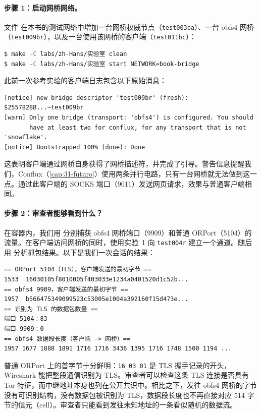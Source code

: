 \paragraph{步骤 1：启动网桥网络。}文件  在本书的测试网络中增加一台网桥权威节点（\texttt{test003ba}）、一台 obfs4 网桥（\texttt{test009br}），以及一台使用该网桥的客户端（\texttt{test011bc}）：
\begin{lstlisting}[language=bash,numbers=none]
$ make -C labs/zh-Hans/实验室 clean
$ make -C labs/zh-Hans/实验室 start NETWORK=book-bridge
\end{lstlisting}
此前一次参考实验的客户端日志包含以下原始消息：
\begin{lstlisting}[numbers=none]
[notice] new bridge descriptor 'test009br' (fresh): $2557828B...~test009br
[warn] Only one bridge (transport: 'obfs4') is configured. You should
       have at least two for conflux, for any transport that is not 'snowflake'.
[notice] Bootstrapped 100% (done): Done
\end{lstlisting}
这表明客户端通过网桥自身获得了网桥描述符，并完成了引导。警告信息提醒我们，Conflux（\cref{cap:31-futuro}）使用两条并行电路，只有一台网桥就无法做到这一点。通过此客户端的 SOCKS 端口（9011）发送网页请求，效果与普通客户端相同。

\paragraph{步骤 2：审查者能够看到什么？}在容器内，我们用  分别捕获 obfs4 网桥端口（9909）和普通 ORPort（5104）的流量。在客户端访问网桥的同时，使用实验~1 向 \texttt{test004r} 建立一个通道。随后用  分析抓包结果。以下是我们一次会话的结果：
\begin{lstlisting}[numbers=none]
== ORPort 5104（TLS），客户端发送的最初字节 ==
1533  16030105f8010005f403033e1234a0401520d1c52b...
== obfs4 9909，客户端发送的最初字节 ==
1957  b566475349099523c53005e1004a392160f15d473e...
== 识别为 TLS 的数据包数量 ==
端口 5104：83
端口 9909：0
== obfs4 数据段长度（客户端 -> 网桥）==
1957 1677 1888 1891 1716 1716 3436 1395 1716 1748 1500 1194 ...
\end{lstlisting}
普通 ORPort 上的首字节十分鲜明：\texttt{16 03 01} 是 TLS 握手记录的开头，Wireshark 能把整段通信识别为 TLS。审查者可以检查这条 TLS 连接是否具有 Tor 特征，而中继地址本身也列在公开共识中。相比之下，发往 obfs4 网桥的字节没有可识别结构，没有数据包被识别为 TLS，数据段长度也不再直接对应 514 字节的信元（cell）。审查者只能看到发往未知地址的一条看似随机的数据流。

